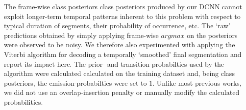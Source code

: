 \documentclass[a4paper]{article}
\begin{document}
The frame-wise class posteriors class posteriors produced by our DCNN cannot exploit longer-term temporal patterns inherent to this problem with respect to typical duration of segments,
their probability of occurrence, etc.
The `raw' predictions obtained by simply applying frame-wise $argmax$ on the posteriors were observed to be noisy.
We therefore also experimented with applying the Viterbi algorithm \cite{rabiner_tutorial_1989} for decoding a temporally `smoothed' final segmentation and report its impact here.
The prior- and transition-probabilties used by the algorithm were calculated calculated on the training dataset and,
being class posteriors, the emission-probabilties were set to $1$.
Unlike most previous works,  %
we did not use an overlap-insertion penalty or manually modify the calculated probabilities.
\end{document}
